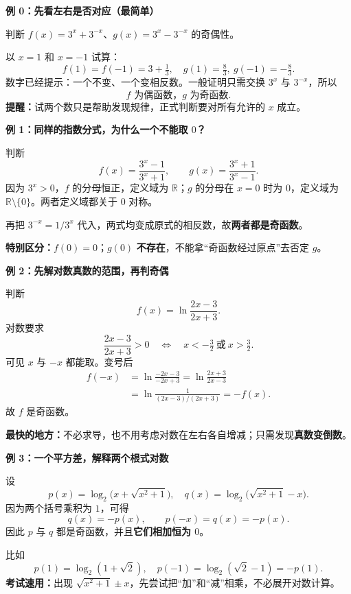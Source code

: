 \clearpage
\begin{examplebox}
\textbf{\textcolor{CExample}{例 0：先看左右是否对应（最简单）}}

判断 $f(x)=3^x+3^{-x}$、$g(x)=3^x-3^{-x}$ 的奇偶性。

以 $x=1$ 和 $x=-1$ 试算：
\[
 f(1)=f(-1)=3+\tfrac13,\quad
 g(1)=\tfrac83,\ g(-1)=-\tfrac83.
\]
数字已经提示：一个不变、一个变相反数。一般证明只需交换 $3^x$ 与 $3^{-x}$，所以
\[
 \boxed{f\text{ 为偶函数，}g\text{ 为奇函数}}.
\]
\textbf{提醒：}试两个数只是帮助发现规律，正式判断要对所有允许的 $x$ 成立。
\end{examplebox}
\clearpage
\begin{examplebox}
\textbf{\textcolor{CExample}{例 1：同样的指数分式，为什么一个不能取 $0$？}}

判断
\[
 f(x)=\frac{3^x-1}{3^x+1},\qquad
 g(x)=\frac{3^x+1}{3^x-1}.
\]
因为 $3^x>0$，$f$ 的分母恒正，定义域为 $\mathbb R$；$g$ 的分母在 $x=0$ 时为 $0$，定义域为 $\mathbb R\setminus\{0\}$。两者定义域都关于 $0$ 对称。

再把 $3^{-x}=1/3^x$ 代入，两式均变成原式的相反数，故\textbf{两者都是奇函数}。

\textbf{特别区分：}$f(0)=0$；$g(0)$ \textbf{不存在}，不能拿“奇函数经过原点”去否定 $g$。
\end{examplebox}
\clearpage
\begin{examplebox}
\textbf{\textcolor{CExample}{例 2：先解对数真数的范围，再判奇偶}}

判断
\[
 f(x)=\ln\frac{2x-3}{2x+3}.
\]
对数要求
\[
 \frac{2x-3}{2x+3}>0
 \quad\Longleftrightarrow\quad x< -\tfrac32\ \text{或}\ x>\tfrac32.
\]
可见 $x$ 与 $-x$ 都能取。变号后
\[
\begin{aligned}
 f(-x)&=\ln\frac{-2x-3}{-2x+3}
 =\ln\frac{2x+3}{2x-3}\\
 &=\ln\frac1{(2x-3)/(2x+3)}=-f(x).
\end{aligned}
\]
故 $\boxed{f\text{ 是奇函数}}$。

\textbf{最快的地方：}不必求导，也不用考虑对数在左右各自增减；只需发现\textbf{真数变倒数}。
\end{examplebox}
\clearpage
\begin{examplebox}
\textbf{\textcolor{CExample}{例 3：一个平方差，解释两个根式对数}}

设
\[
 p(x)=\log_2\!\bigl(x+\sqrt{x^2+1}\bigr),\quad
 q(x)=\log_2\!\bigl(\sqrt{x^2+1}-x\bigr).
\]
因为两个括号乘积为 $1$，可得
\[
 q(x)=-p(x),\qquad p(-x)=q(x)=-p(x).
\]
因此 $p$ 与 $q$ 都是奇函数，并且\textbf{它们相加恒为 $0$}。

比如
\[
 p(1)=\log_2(1+\sqrt2),\quad
 p(-1)=\log_2(\sqrt2-1)=-p(1).
\]
\textbf{考试速用：}出现 $\sqrt{x^2+1}\pm x$，先尝试把“加”和“减”相乘，不必展开对数计算。
\end{examplebox}
